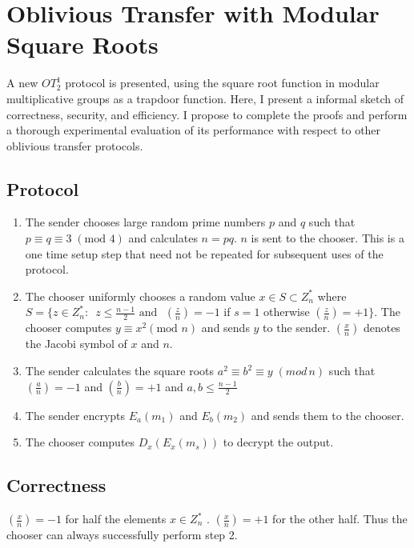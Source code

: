 
\chapter{Oblivious Transfer with Modular Square Roots}\label{sec:OT-SquareRoots}

A new $OT_{2}^{1}$ protocol is presented, using the square root function
in modular multiplicative groups as a trapdoor function. Here, I present
a informal sketch of correctness, security, and efficiency. I propose
to complete the proofs and perform a thorough experimental evaluation
of its performance with respect to other oblivious transfer protocols.


\section{Protocol}
\begin{enumerate}
\item The sender chooses large random prime numbers $p$ and $q$ such that
$p\equiv q\equiv3\;(\mbox{mod }4)$ and calculates $n=pq$. $n$ is
sent to the chooser. This is a one time setup step that need not be
repeated for subsequent uses of the protocol.
\item The chooser uniformly chooses a random value $x\in S\subset Z_{n}^{*}$
where $S=\{z\in Z_{n}^{*}:$~$z\le\frac{n-1}{2}\mbox{ and }$ $\left(\frac{z}{n}\right)=-1$
if $s=1$ otherwise $\left(\frac{z}{n}\right)=+1\}$. The chooser
computes $y\equiv x^{2}(\mbox{mod }n)$ and sends $y$ to the sender.
$\left(\frac{x}{n}\right)$ denotes the Jacobi symbol of $x$ and
$n$.
\item The sender calculates the square roots $a^{2}\equiv b^{2}\equiv y\;(mod\, n)$
such that $\left(\frac{a}{n}\right)=-1$ and $\left(\frac{b}{n}\right)=+1$
and $a,b\le\frac{n-1}{2}$
\item The sender encrypts $E_{a}(m_{1})$ and $E_{b}(m_{2})$ and sends
them to the chooser.
\item The chooser computes $D_{x}(E_{x}(m_{s}))$ to decrypt the output.
\end{enumerate}

\section{Correctness}

$\left(\frac{x}{n}\right)=-1$ for half the elements $x\in Z_{n}^{*}$
. $\left(\frac{x}{n}\right)=+1$ for the other half. Thus the chooser
can always successfully perform step 2.

